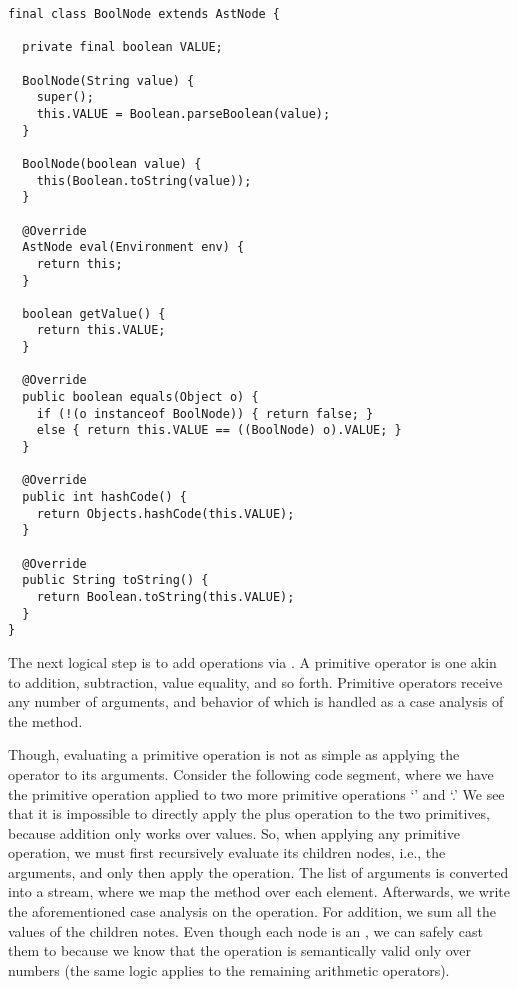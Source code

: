 \begin{lstlisting}[language=MyJava]
final class BoolNode extends AstNode {

  private final boolean VALUE;

  BoolNode(String value) {
    super();
    this.VALUE = Boolean.parseBoolean(value);
  }

  BoolNode(boolean value) { 
    this(Boolean.toString(value)); 
  }

  @Override
  AstNode eval(Environment env) { 
    return this; 
  }
  
  boolean getValue() {
    return this.VALUE;
  }

  @Override
  public boolean equals(Object o) {
    if (!(o instanceof BoolNode)) { return false; }
    else { return this.VALUE == ((BoolNode) o).VALUE; }
  }
  
  @Override
  public int hashCode() {
    return Objects.hashCode(this.VALUE);
  }

  @Override
  public String toString() { 
    return Boolean.toString(this.VALUE); 
  }
}
\end{lstlisting}

The next logical step is to add operations via . A primitive operator is one akin to addition, subtraction, value equality, and so forth. Primitive operators receive any number of arguments, and behavior of which is handled as a case analysis of the  method. 

Though, evaluating a primitive operation is not as simple as applying the operator to its arguments. Consider the following code segment, where we have the primitive operation \ttt{+} applied to two more primitive operations `\ttt{*}' and `\ttt{-}.' We see that it is impossible to directly apply the plus operation to the two primitives, because addition only works over  values. So, when applying any primitive operation, we must first recursively evaluate its children nodes, i.e., the arguments, and only then apply the operation. The list of arguments is converted into a stream, where we map the  method over each element. Afterwards, we write the aforementioned case analysis on the operation. For addition, we sum all the values of the children notes. Even though each node is an , we can safely cast them to  because we know that the operation is semantically valid only over numbers (the same logic applies to the remaining arithmetic operators).

